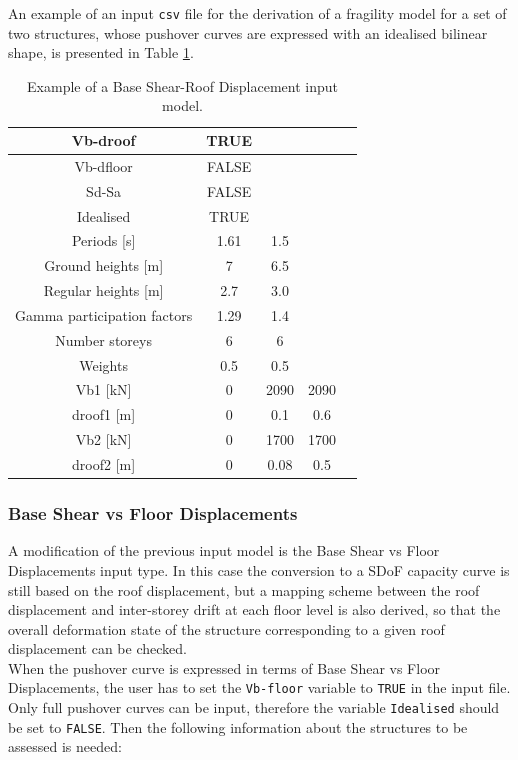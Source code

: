 An example of an input \verb=csv= file for the derivation of a fragility model for a set of two structures, whose pushover curves are expressed with an idealised bilinear shape, is presented in Table \ref{table:Vb-droof_input}.

\begin {table}[htb]
\caption{Example of a Base Shear-Roof Displacement input model.}
\label{table:Vb-droof_input}
\begin{center}
  \begin{tabular}{ | c | c | c | c | c |}
  \hline
    Vb-droof & TRUE &  &  \\ \hline
    Vb-dfloor & FALSE & & \\ \hline
    Sd-Sa & FALSE & & \\ \hline
    Idealised & TRUE & & \\ \hline
    Periods [s] & 1.61 & 1.5 & \\ \hline
    Ground heights [m] & 7 & 6.5 & \\ \hline
    Regular heights [m] & 2.7 & 3.0 & \\ \hline
    Gamma participation factors & 1.29 & 1.4 & \\ \hline
    Number storeys & 6 & 6 & \\ \hline
    Weights & 0.5 & 0.5 & \\ \hline
    Vb1 [kN] & 0 & 2090 & 2090 \\ \hline
    droof1 [m] & 0 & 0.1 & 0.6 \\ \hline
    Vb2 [kN] & 0 & 1700 & 1700 \\ \hline
    droof2 [m] & 0 & 0.08 & 0.5 \\ \hline
  \end{tabular}
\end{center}
\end{table}

\subsubsection{Base Shear vs Floor Displacements}
\label{subsubsec:VB-Dfloor}
A modification of the previous input model is the Base Shear vs Floor Displacements input type. In this case the conversion to a SDoF capacity curve is still based on the roof displacement, but a mapping scheme between the roof displacement and inter-storey drift at each floor level is also derived, so that the overall deformation state of the structure corresponding to a given roof displacement can be checked.\\
When the pushover curve is expressed in terms of Base Shear vs Floor Displacements, the user has to set the \verb=Vb-floor= variable to \verb=TRUE= in the input file. Only full pushover curves can be input, therefore the variable \verb=Idealised= should be set to \verb=FALSE=. Then the following information about the structures to be assessed is needed:\\


